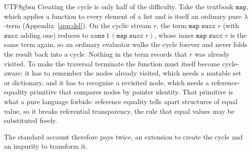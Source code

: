 \begin{CJK*}{UTF8}{gbsn}
  Creating the cycle is only half of the difficulty. Take the textbook $\mathtt{map}$, which applies a function to every element of a list and is itself an ordinary pure $\lambda$-term (Appendix~\ref{app:dsl}). On the cyclic stream $r$, the term $\mathtt{map}\;\mathtt{succ}\;r$ (with $\mathtt{succ}$ adding one) reduces to $\mathtt{cons}\,1\,(\mathtt{map}\;\mathtt{succ}\;r)$, whose inner $\mathtt{map}\;\mathtt{succ}\;r$ is the same term again, so an ordinary evaluator walks the cycle forever and never folds the result back into a cycle. Nothing in the term records that $r$ was already visited. To make the traversal terminate the function must itself become cycle-aware: it has to remember the nodes already visited, which needs a mutable set or dictionary, and it has to recognize a revisited node, which needs a reference-equality primitive that compares nodes by pointer identity. That primitive is what a pure language forbids: reference equality tells apart structures of equal value, so it breaks referential transparency, the rule that equal values may be substituted freely.

  The standard account therefore pays twice, an extension to create the cycle and an impurity to transform it.
  \fi

  \subsection{}


\end{CJK*}
